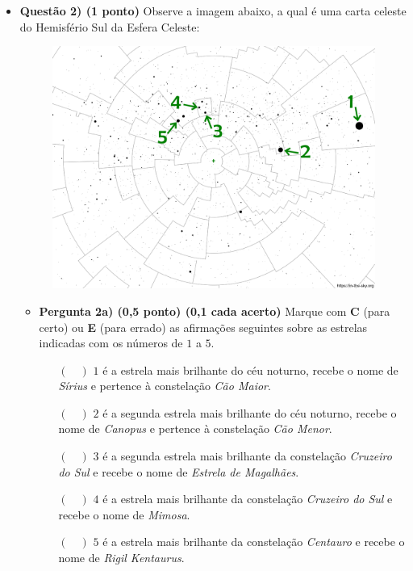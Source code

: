 \documentclass[a4paper, 12pt]{article}
\begin{document}
\begin{flushleft}
\begin{itemize}
		\item \textbf{Questão 2) (1 ponto)} Observe a imagem abaixo, a qual é uma carta celeste do Hemisfério Sul da Esfera Celeste:
			\begin{figure}[H]
				\centering
				\includegraphics[scale=0.5]{./img/2.png}
			\end{figure}
			\begin{itemize}
				\item \textbf{Pergunta 2a) (0,5 ponto) (0,1 cada acerto)} Marque com \textbf{C} (para certo) ou \textbf{E} (para errado) as afirmações seguintes sobre as estrelas indicadas com os números de $1$ a $5$.
					\begin{itemize}
						\item[$(\quad)$] $1$ é a estrela mais brilhante do céu noturno, recebe o nome de \textit{Sírius} e pertence à constelação \textit{Cão Maior}.
						\item[$(\quad)$] $2$ é a segunda estrela mais brilhante do céu noturno, recebe o nome de \textit{Canopus} e pertence à constelação \textit{Cão Menor}.
						\item[$(\quad)$] $3$ é a segunda estrela mais brilhante da constelação \textit{Cruzeiro do Sul} e recebe o nome de \textit{Estrela de Magalhães}.
						\item[$(\quad)$] $4$ é a estrela mais brilhante da constelação \textit{Cruzeiro do Sul} e recebe o nome de \textit{Mimosa}.
						\item[$(\quad)$] $5$ é a estrela mais brilhante da constelação \textit{Centauro} e recebe o nome de \textit{Rigil Kentaurus}.
					\end{itemize}

\end{itemize}
\end{itemize}
\end{flushleft}
\end{document}
